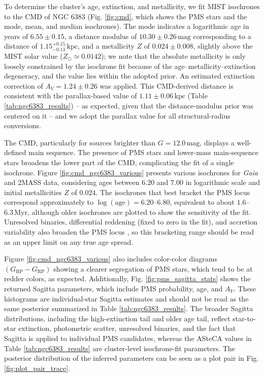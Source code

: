 \documentclass{aa}
\begin{document}
To determine the cluster's age, extinction, and metallicity, we fit MIST isochrones to the CMD of NGC 6383 (Fig. \ref{fig:cmd}, which shows the PMS stars and the mode, mean, and median isochrones). The mode indicates a logarithmic age in years of $6.55 \pm 0.15$, a distance modulus of $10.30\pm 0.26\,\mathrm{mag}$ corresponding to a distance of $1.15_{-0.13}^{+0.15}\,\mathrm{kpc}$, and a metallicity $Z $ of $0.024 \pm 0.008$, slightly above the MIST solar value ($Z_\odot\simeq0.0142$); we note that the absolute metallicity is only loosely constrained by the isochrone fit because of the age--metallicity--extinction degeneracy, and the value lies within the adopted prior. An estimated extinction correction of $A_V = 1.24 \pm 0.26$ was applied. This CMD-derived distance is consistent with the parallax-based value of $1.11 \pm 0.06\,\mathrm{kpc}$ (Table \ref{tab:ngc6383_results}) -- as expected, given that the distance-modulus prior was centered on it -- and we adopt the parallax value for all structural-radius conversions.

The CMD, particularly for sources brighter than $G=12.0\,\mathrm{mag}$, displays a well-defined main sequence. The presence of PMS stars and lower-mass main-sequence stars broadens the lower part of the CMD, complicating the fit of a single isochrone. Figure \ref{fig:cmd_ngc6383_various} presents various isochrones for \textit{Gaia} and 2MASS data, considering ages between $6.20$ and $7.00$ in logarithmic scale and initial metallicities $ Z $ of $0.024$. The isochrones that best bracket the PMS locus correspond approximately to $\log(\mathrm{age})=6.20$--$6.80$, equivalent to about $1.6$--$6.3\,\mathrm{Myr}$, although older isochrones are plotted to show the sensitivity of the fit. Unresolved binaries, differential reddening (fixed to zero in the fit), and accretion variability also broaden the PMS locus \citep{2010ApJ...723..166D}, so this bracketing range should be read as an upper limit on any true age spread.

Figure \ref{fig:cmd_ngc6383_various} also includes color-color diagrams $(G_\mathrm{BP} - G_\mathrm{RP})$ showing a clearer segregation of PMS stars, which tend to be at redder colors, as expected. Additionally, Fig. \ref{fig:pms_sagitta_stats} shows the returned Sagitta parameters, which include PMS probability, age, and $A_V$. These histograms are individual-star Sagitta estimates and should not be read as the same posterior summarized in Table \ref{tab:ngc6383_results}. The broader Sagitta distributions, including the high-extinction tail and older age tail, reflect star-to-star extinction, photometric scatter, unresolved binaries, and the fact that Sagitta is applied to individual PMS candidates, whereas the ASteCA values in Table \ref{tab:ngc6383_results} are cluster-level isochrone-fit parameters. The posterior distribution of the inferred parameters can be seen as a plot pair in Fig. \ref{fig:plot_pair_trace}.
\end{document}
